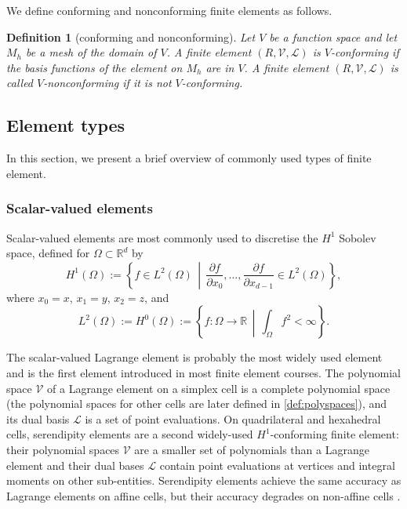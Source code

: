 \documentclass[sn-mathphys-num]{sn-jnl}%
\theoremstyle{thmstyleone}%
\newcommand{\refel}{R}
\newcommand{\polyspace}{\mathcal{V}}
\newcommand{\dualbasis}{\mathcal{L}}
\theoremstyle{thmstyletwo}%
\theoremstyle{thmstylethree}%
\newtheorem{definition}{Definition}%
\begin{document}
We define conforming and nonconforming finite elements as follows.

\begin{definition}[conforming and nonconforming]
Let $V$ be a function space and let $M_h$ be a mesh of the domain of $V$.
A finite element $(\refel, \polyspace, \dualbasis)$ is $V$-conforming if the basis functions of the element on $M_h$ are in $V$.
A finite element $(\refel, \polyspace, \dualbasis)$ is called $V$-nonconforming if it is not $V$-conforming.
\end{definition}


\subsection{Element types}\label{sec:definition:types}
In this section, we present a brief overview of commonly used types of finite element.
\subsubsection{Scalar-valued elements}
Scalar-valued elements are most commonly used to discretise the $H^1$ Sobolev space, defined
for $\Omega\subset\mathbb{R}^d$ by
\[
H^1(\Omega):=\left\{f\in L^2(\Omega)\,\middle|\,
\frac{\partial f}{\partial x_0},\dots,
\frac{\partial f}{\partial x_{d-1}}
\in L^2(\Omega)\right\},
\]
where \(x_0=x\), \(x_1=y\), \(x_2=z\), and
\[
L^2(\Omega):=H^0(\Omega):=\left\{f:\Omega\to\mathbb{R}\,\middle|\,\int_\Omega f^2 <\infty\right\}.
\]

The scalar-valued Lagrange element is probably the most
widely used element and is the first element introduced in most finite element courses. The polynomial space $\polyspace$ of a Lagrange element
on a simplex cell is a complete polynomial space (the polynomial spaces for other cells are later defined in \cref{def:polyspaces}),
and its dual basis $\dualbasis$ is a set of point evaluations.
On quadrilateral and hexahedral cells, serendipity \cite{serendipity} elements are a second widely-used $H^1$-conforming finite element: their polynomial spaces
$\polyspace$ are a smaller set of polynomials than a Lagrange element and their dual bases $\dualbasis$ contain point evaluations at vertices and integral moments on
other sub-entities. Serendipity elements achieve the same accuracy as Lagrange elements on affine cells, but their accuracy degrades on non-affine cells \cite{abf-approx}.
\end{document}
